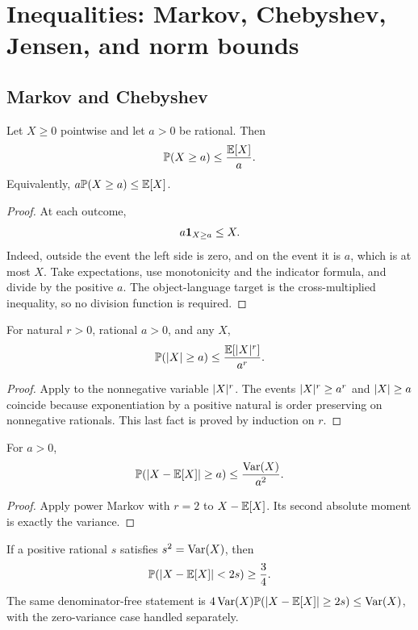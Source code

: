 \section{Inequalities: Markov, Chebyshev, Jensen, and norm bounds}\label{sec:inequalities}

\subsection{Markov and Chebyshev}

\begin{theorem}\label{thm:markov}
Let \(X\ge0\) pointwise and let \(a>0\) be rational.  Then
\[
 \mathbb P(X\ge a)\le\frac{\mathbb E[X]}{a}.
\]
Equivalently, \(a\mathbb P(X\ge a)\le\mathbb E[X]\).
\end{theorem}

\begin{proof}
At each outcome,
\[
 a\mathbf 1_{X\ge a}\le X.
\]
Indeed, outside the event the left side is zero, and on the event it is \(a\),
which is at most \(X\).  Take expectations, use monotonicity and the indicator
formula, and divide by the positive \(a\).  The object-language target is the
cross-multiplied inequality, so no division function is required.
\end{proof}

\begin{corollary}\label{cor:power-markov}
For natural \(r>0\), rational \(a>0\), and any \(X\),
\[
 \mathbb P(\lvert X\rvert\ge a)\le\frac{\mathbb E[\lvert X\rvert^r]}{a^r}.
\]
\end{corollary}

\begin{proof}
Apply  to the nonnegative variable \(\lvert X\rvert^r\).  The events
\(\lvert X\rvert^r\ge a^r\) and \(\lvert X\rvert\ge a\) coincide because exponentiation by a
positive natural is order preserving on nonnegative rationals.  This last fact
is proved by induction on \(r\).
\end{proof}

\begin{theorem}\label{thm:chebyshev}
For \(a>0\),
\[
 \mathbb P(\lvert X-\mathbb E[X]\rvert\ge a)\le\frac{\operatorname{Var}(X)}{a^2}.
\]
\end{theorem}

\begin{proof}
Apply power Markov with \(r=2\) to \(X-\mathbb E[X]\).  Its second absolute moment is
exactly the variance.
\end{proof}

\begin{corollary}
\label{cor:three-quarters}
If a positive rational \(s\) satisfies \(s^2=\operatorname{Var}(X)\), then
\[
 \mathbb P(\lvert X-\mathbb E[X]\rvert<2s)\ge\frac34.
\]
The same denominator-free statement is
\(4\operatorname{Var}(X)\mathbb P(\lvert X-\mathbb E[X]\rvert\ge2s)\le\operatorname{Var}(X)\), with the zero-variance case
handled separately.
\end{corollary}


